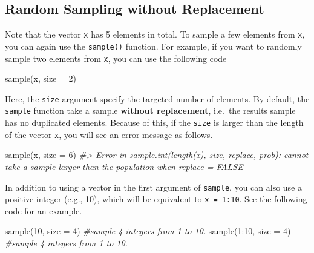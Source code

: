 \documentclass[
]{book}
\newenvironment{Shaded}{\begin{snugshade}}{\end{snugshade}}
\newcommand{\AttributeTok}[1]{\textcolor[rgb]{0.77,0.63,0.00}{#1}}
\newcommand{\CommentTok}[1]{\textcolor[rgb]{0.56,0.35,0.01}{\textit{#1}}}
\newcommand{\DecValTok}[1]{\textcolor[rgb]{0.00,0.00,0.81}{#1}}
\newcommand{\FunctionTok}[1]{\textcolor[rgb]{0.00,0.00,0.00}{#1}}
\newcommand{\NormalTok}[1]{#1}
\newcommand{\SpecialCharTok}[1]{\textcolor[rgb]{0.00,0.00,0.00}{#1}}
\begin{document}
\hypertarget{random-sampling-without-replacement}{%
\subsection{Random Sampling without Replacement}\label{random-sampling-without-replacement}}

Note that the vector \texttt{x} has 5 elements in total. To sample a few elements from \texttt{x}, you can again use the \texttt{sample()} function. For example, if you want to randomly sample two elements from \texttt{x}, you can use the following code

\begin{Shaded}
\begin{Highlighting}[]
\FunctionTok{sample}\NormalTok{(x, }\AttributeTok{size =} \DecValTok{2}\NormalTok{) }
\end{Highlighting}
\end{Shaded}

Here, the \texttt{size} argument specify the targeted number of elements. By default, the \texttt{sample} function take a sample \textbf{without replacement}, i.e.~the results sample has no duplicated elements. Because of this, if the \texttt{size} is larger than the length of the vector \texttt{x}, you will see an error message as follows.

\begin{Shaded}
\begin{Highlighting}[]
\FunctionTok{sample}\NormalTok{(x, }\AttributeTok{size =} \DecValTok{6}\NormalTok{)}
\CommentTok{\#\textgreater{} Error in sample.int(length(x), size, replace, prob): cannot take a sample larger than the population when \textquotesingle{}replace = FALSE\textquotesingle{}}
\end{Highlighting}
\end{Shaded}

In addition to using a vector in the first argument of \texttt{sample}, you can also use a positive integer (e.g., 10), which will be equivalent to \texttt{x\ =\ 1:10}. See the following code for an example.

\begin{Shaded}
\begin{Highlighting}[]
\FunctionTok{sample}\NormalTok{(}\DecValTok{10}\NormalTok{, }\AttributeTok{size =} \DecValTok{4}\NormalTok{)   }\CommentTok{\#sample 4 integers from 1 to 10.}
\FunctionTok{sample}\NormalTok{(}\DecValTok{1}\SpecialCharTok{:}\DecValTok{10}\NormalTok{, }\AttributeTok{size =} \DecValTok{4}\NormalTok{) }\CommentTok{\#sample 4 integers from 1 to 10.}
\end{Highlighting}
\end{Shaded}
\end{document}
